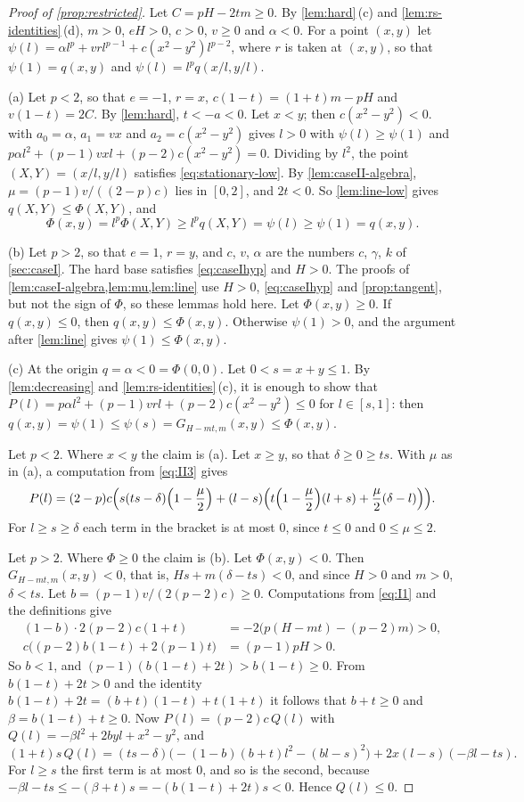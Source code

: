 \begin{proof}[Proof of \cref{prop:restricted}]
Let $C=pH-2tm\ge0$. By \cref{lem:hard}\,(c) and \cref{lem:rs-identities}\,(d), $m>0$, $eH>0$,
$c>0$, $v\ge0$ and $\alpha<0$. For a point $(x,y)$ let
$\psi(l)=\alpha l^p+vrl^{p-1}+c(x^2-y^2)l^{p-2}$, where $r$ is taken at $(x,y)$, so that
$\psi(1)=q(x,y)$ and $\psi(l)=l^pq(x/l,y/l)$.

(a) Let $p<2$, so that $e=-1$, $r=x$, $c(1-t)=(1+t)m-pH$ and $v(1-t)=2C$. By
\cref{lem:hard}, $t<-a<0$. Let $x<y$; then $c(x^2-y^2)<0$.  with $a_0=\alpha$,
$a_1=vx$ and $a_2=c(x^2-y^2)$ gives $l>0$ with $\psi(l)\ge\psi(1)$ and
$p\alpha l^2+(p-1)vxl+(p-2)c(x^2-y^2)=0$. Dividing by $l^2$, the point $(X,Y)=(x/l,y/l)$
satisfies \eqref{eq:stationary-low}. By \cref{lem:caseII-algebra}, $\mu=(p-1)v/((2-p)c)$ lies in
$[0,2]$, and $2t<0$. So \cref{lem:line-low} gives $q(X,Y)\le\Phi(X,Y)$, and
\[
  \Phi(x,y)=l^p\Phi(X,Y)\ge l^pq(X,Y)=\psi(l)\ge\psi(1)=q(x,y).
\]

(b) Let $p>2$, so that $e=1$, $r=y$, and $c$, $v$, $\alpha$ are the numbers $c$, $\gamma$, $k$
of \cref{sec:caseI}. The hard base satisfies \eqref{eq:caseIhyp} and $H>0$. The proofs of
\cref{lem:caseI-algebra,lem:mu,lem:line} use $H>0$, \eqref{eq:caseIhyp} and
\cref{prop:tangent}, but not the sign of $\Phi$, so these lemmas hold here. Let
$\Phi(x,y)\ge0$. If $q(x,y)\le0$, then $q(x,y)\le\Phi(x,y)$. Otherwise $\psi(1)>0$, and the
argument after \cref{lem:line} gives $\psi(1)\le\Phi(x,y)$.

(c) At the origin $q=\alpha<0=\Phi(0,0)$. Let $0<s=x+y\le1$. By \cref{lem:decreasing} and
\cref{lem:rs-identities}\,(c), it is enough to show that
$P(l)=p\alpha l^2+(p-1)vrl+(p-2)c(x^2-y^2)\le0$ for $l\in[s,1]$: then
$q(x,y)=\psi(1)\le\psi(s)=G_{H-mt,m}(x,y)\le\Phi(x,y)$.

Let $p<2$. Where $x<y$ the claim is (a). Let $x\ge y$, so that $\delta\ge0\ge ts$. With $\mu$
as in (a), a computation from \eqref{eq:II3} gives
\[
  P(l)=(2-p)c\Bigl(s(ts-\delta)\Bigl(1-\frac\mu2\Bigr)+(l-s)\Bigl(t\Bigl(1-\frac\mu2\Bigr)(l+s)
  +\frac\mu2(\delta-l)\Bigr)\Bigr).
\]
For $l\ge s\ge\delta$ each term in the bracket is at most $0$, since $t\le0$ and $0\le\mu\le2$.

Let $p>2$. Where $\Phi\ge0$ the claim is (b). Let $\Phi(x,y)<0$. Then
$G_{H-mt,m}(x,y)<0$, that is, $Hs+m(\delta-ts)<0$, and since $H>0$ and $m>0$, $\delta<ts$.
Let $b=(p-1)v/(2(p-2)c)\ge0$. Computations from \eqref{eq:I1} and the definitions give
\begin{align*}
  (1-b)\cdot2(p-2)c(1+t)&=-2\bigl(p(H-mt)-(p-2)m\bigr)>0,\\
  c\bigl((p-2)b(1-t)+2(p-1)t\bigr)&=(p-1)pH>0 .
\end{align*}
So $b<1$, and $(p-1)(b(1-t)+2t)>b(1-t)\ge0$. From $b(1-t)+2t>0$ and the identity
$b(1-t)+2t=(b+t)(1-t)+t(1+t)$ it follows that $b+t\ge0$ and $\beta=b(1-t)+t\ge0$. Now
$P(l)=(p-2)c\,Q(l)$ with $Q(l)=-\beta l^2+2byl+x^2-y^2$, and
\[
  (1+t)s\,Q(l)=(ts-\delta)\bigl(-(1-b)(b+t)l^2-(bl-s)^2\bigr)+2x(l-s)(-\beta l-ts).
\]
For $l\ge s$ the first term is at most $0$, and so is the second, because
$-\beta l-ts\le-(\beta+t)s=-(b(1-t)+2t)s<0$. Hence $Q(l)\le0$.
\end{proof}

